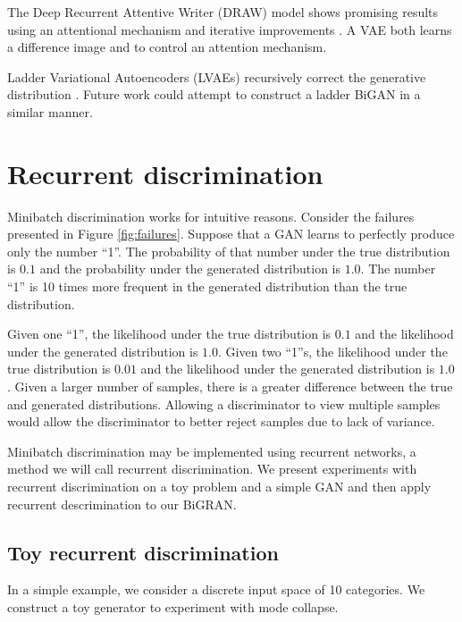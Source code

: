 \documentclass{article}
\begin{document}
The Deep Recurrent Attentive Writer (DRAW) model shows promising results using an attentional mechanism and iterative improvements \cite{Gregor2015}. A VAE both learns a difference image and to control an attention mechanism.

Ladder Variational Autoencoders (LVAEs) recursively correct the generative distribution \cite{Sønderby2016}. Future work could attempt to construct a ladder BiGAN in a similar manner.



\section{Recurrent discrimination}
Minibatch discrimination works for intuitive reasons. Consider the failures presented in Figure \ref{fig:failures}. Suppose that a GAN learns to perfectly produce only the number ``1''. The probability of that number under the true distribution is $0.1$ and the probability under the generated distribution is $1.0$. The number ``1'' is 10 times more frequent in the generated distribution than the true distribution.

Given one ``1'', the likelihood under the true distribution is $0.1$ and the likelihood under the generated distribution is $1.0$. Given two ``1''s, the likelihood under the true distribution is $0.01$ and the likelihood under the generated distribution is $1.0$. Given a larger number of samples, there is a greater difference between the true and generated distributions. Allowing a discriminator to view multiple samples would allow the discriminator to better reject samples due to lack of variance.

Minibatch discrimination may be implemented using recurrent networks, a method we will call recurrent discrimination. We present experiments with recurrent discrimination on a toy problem and a simple GAN and then apply recurrent descrimination to our BiGRAN.

\subsection{Toy recurrent discrimination}
In a simple example, we consider a discrete input space of 10 categories. We construct a toy generator to experiment with mode collapse.
\end{document}
